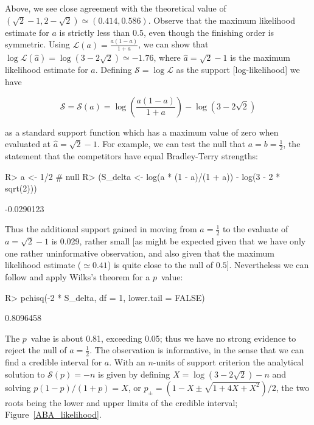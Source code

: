 \documentclass[article]{jss}
\begin{document}
Above, we see close agreement with the theoretical value of
$(\sqrt{2}-1,2-\sqrt{2})\simeq (0.414,0.586)$.  Observe that the
maximum likelihood estimate for $a$ is strictly less than 0.5, even
though the finishing order is symmetric.  Using
$\mathcal{L}(a)=\frac{a(1-a)}{1+a}$, we can show that
$\log\mathcal{L}(\hat{a})=\log\left(3-2\sqrt{2}\right)\simeq -1.76$,
where $\hat{a}=\sqrt{2}-1$ is the maximum likelihood estimate for $a$.
Defining $\mathcal{S}=\log\mathcal{L}$ as the support [log-likelihood]
we have

\begin{equation}
\mathcal{S}=\mathcal{S}(a)=\log\left(\frac{a(1-a)}{1+a}\right)-\log\left(3-2\sqrt{2}\right)
\end{equation}

as a standard support function which has a maximum value of zero when
evaluated at $\hat{a}=\sqrt{2}-1$.  For example, we can test the null
that $a=b=\frac{1}{2}$, the statement that the competitors have equal
Bradley-Terry strengths:


\begin{Schunk}
\begin{Sinput}
R> a <- 1/2 # null
R> (S_delta <- log(a * (1 - a)/(1 + a)) - log(3 - 2 * sqrt(2)))
\end{Sinput}
\begin{Soutput}
[1] -0.0290123
\end{Soutput}
\end{Schunk}

Thus the additional support gained in moving from $a=\frac{1}{2}$ to
the evaluate of $a=\sqrt{2}-1$ is 0.029, rather small [as might be
expected given that we have only one rather uninformative observation,
and also given that the maximum likelihood estimate ($\simeq 0.41$) is
quite close to the null of $0.5$].  Nevertheless we can follow
\cite{edwards1972} and apply Wilks's theorem for a $p$~value:

\begin{Schunk}
\begin{Sinput}
R> pchisq(-2 * S_delta, df = 1, lower.tail = FALSE)
\end{Sinput}
\begin{Soutput}
[1] 0.8096458
\end{Soutput}
\end{Schunk}

The $p$~value is about 0.81, exceeding 0.05; thus we have no strong
evidence to reject the null of $a=\frac{1}{2}$.  The observation is
informative, in the sense that we can find a credible interval for
$a$.  With an $n$-units of support criterion the analytical solution to
$\mathcal{S}(p)=-n$ is given by defining $X=\log(3-2\sqrt{2})-n$ and
solving $p(1-p)/(1+p)=X$, or
$p_\pm=\left(1-X\pm\sqrt{1+4X+X^2}\right)/2$, the two roots being the
lower and upper limits of the credible interval;
Figure~\ref{ABA_likelihood}.
\end{document}
